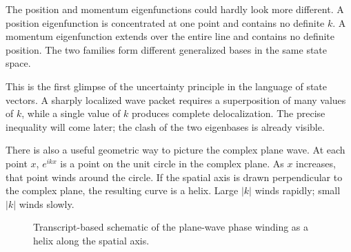 The position and momentum eigenfunctions could hardly look more different.
A position eigenfunction is concentrated at one point and contains no
definite \(k\). A momentum eigenfunction extends over the entire line and
contains no definite position. The two families form different generalized
bases in the same state space.

This is the first glimpse of the uncertainty principle in the language of
state vectors. A sharply localized wave packet requires a superposition of
many values of \(k\), while a single value of \(k\) produces complete
delocalization. The precise inequality will come later; the clash of the two
eigenbases is already visible.

There is also a useful geometric way to picture the complex plane wave. At
each point \(x\), \(e^{ikx}\) is a point on the unit circle in the complex
plane. As \(x\) increases, that point winds around the circle. If the spatial
axis is drawn perpendicular to the complex plane, the resulting curve is a
helix. Large \(|k|\) winds rapidly; small \(|k|\) winds slowly.

\begin{classroomqa}
\end{classroomqa}

\begin{figure}[tbp]
  \centering
  \caption{Transcript-based schematic of the plane-wave phase winding as a
  helix along the spatial axis.}
\end{figure}

\begin{classroomqa}
\end{classroomqa}

